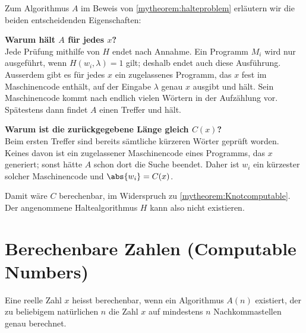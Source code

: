 \begin{myremark}
	Zum Algorithmus $A$ im Beweis von \cref{mytheorem:halteproblem} erläutern wir die beiden entscheidenden Eigenschaften:

	\textbf{Warum hält $A$ für jedes $x$?}\\
	Jede Prüfung mithilfe von $H$ endet nach Annahme. Ein Programm $M_i$ wird nur ausgeführt, wenn $H(w_i,\lambda)=1$ gilt; deshalb endet auch diese Ausführung. Ausserdem gibt es für jedes $x$ ein zugelassenes Programm, das $x$ fest im Maschinencode enthält, auf der Eingabe $\lambda$ genau $x$ ausgibt und hält. Sein Maschinencode kommt nach endlich vielen Wörtern in der Aufzählung vor. Spätestens dann findet $A$ einen Treffer und hält.

	\textbf{Warum ist die zurückgegebene Länge gleich $C(x)$?}\\
	Beim ersten Treffer sind bereits sämtliche kürzeren Wörter geprüft worden. Keines davon ist ein zugelassener Maschinencode eines Programms, das $x$ generiert; sonst hätte $A$ schon dort die Suche beendet. Daher ist $w_i$ ein kürzester solcher Maschinencode und $\abs{w_i}=C(x)$.

	Damit wäre $C$ berechenbar, im Widerspruch zu \cref{mytheorem:Knotcomputable}. Der angenommene Haltealgorithmus $H$ kann also nicht existieren.
\end{myremark}

\section{Berechenbare Zahlen (Computable Numbers)}
\begin{mydefinition}\label{mydefinition:comp_numb}
	Eine reelle Zahl $x$ heisst berechenbar, wenn ein Algorithmus $A(n)$ existiert, der zu beliebigem natürlichen $n$ die Zahl $x$ auf mindestens $n$ Nachkommastellen genau berechnet.
\end{mydefinition}

